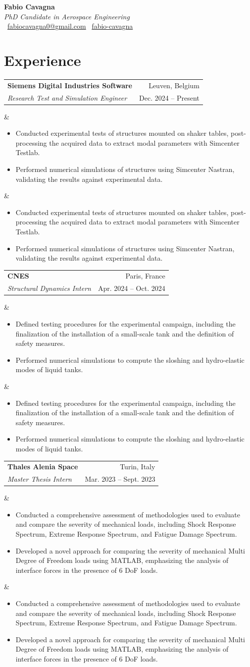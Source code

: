 \documentclass[10pt, a4paper]{article}
\makeatletter
\newcommand{\cventry}[5]{%
  \noindent\begin{tabularx}{\textwidth}{@{}X r@{}}
    \textbf{#2} & #3 \\
    \textit{#1} & \textcolor{datecolor}{#4} \\
  \end{tabularx}
  \ifx&#5&\else
    \vspace{-0.5em}
    #5
  \fi
  \vspace{0.1em}
}
\makeatother
\begin{document}
\begin{center}
  {\LARGE\bfseries Fabio Cavagna}\\[0.3em]
  {\textit{PhD Candidate in Aerospace Engineering}}\\[0.4em]
  \faEnvelope~\href{mailto:fabiocavagna0@gmail.com}{fabiocavagna0@gmail.com} \quad
  \faLinkedin~\href{https://www.linkedin.com/in/fabio-cavagna}{fabio-cavagna}
\end{center}

\vspace{-0.8em}

\section{Experience}

\cventry
  {Research Test and Simulation Engineer}
  {Siemens Digital Industries Software}
  {Leuven, Belgium}
  {Dec. 2024 -- Present}
  {\begin{itemize}
    \item Conducted experimental tests of structures mounted on shaker tables, post-processing the acquired data to extract modal parameters with Simcenter Testlab.
    \item Performed numerical simulations of structures using Simcenter Nastran, validating the results against experimental data.
  \end{itemize}}

\cventry
  {Structural Dynamics Intern}
  {CNES}
  {Paris, France}
  {Apr. 2024 -- Oct. 2024}
  {\begin{itemize}
    \item Defined testing procedures for the experimental campaign, including the finalization of the installation of a small-scale tank and the definition of safety measures.
    \item Performed numerical simulations to compute the sloshing and hydro-elastic modes of liquid tanks.
  \end{itemize}}

\cventry
  {Master Thesis Intern}
  {Thales Alenia Space}
  {Turin, Italy}
  {Mar. 2023 -- Sept. 2023}
  {\begin{itemize}
    \item Conducted a comprehensive assessment of methodologies used to evaluate and compare the severity of mechanical loads, including Shock Response Spectrum, Extreme Response Spectrum, and Fatigue Damage Spectrum.
    \item Developed a novel approach for comparing the severity of mechanical Multi Degree of Freedom loads using MATLAB, emphasizing the analysis of interface forces in the presence of 6 DoF loads.
  \end{itemize}}
\end{document}
